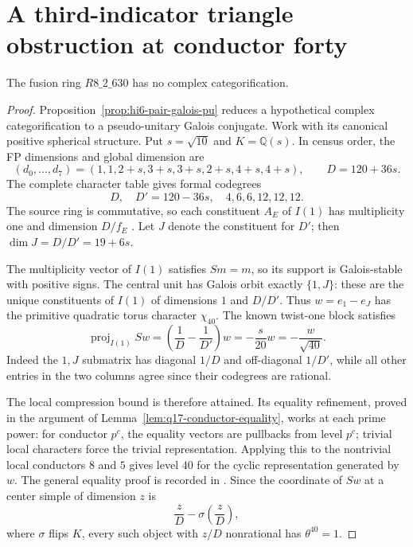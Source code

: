 \section{A third-indicator triangle obstruction at conductor forty}
\label{sec:q630-weighted-indicator}

\begin{theorem}\label{thm:q630-exclusion}
The fusion ring $R8\_2\_630$ has no complex categorification.
\end{theorem}
\begin{proof}
Proposition~\ref{prop:hi6-pair-galois-pu} reduces a hypothetical complex
categorification to a pseudo-unitary Galois conjugate. Work with its
canonical positive spherical structure. Put $s=\sqrt{10}$ and
$K=\mathbb Q(s)$. In census order, the FP dimensions and global
dimension are
\[
(d_0,\ldots,d_7)=(1,1,2+s,3+s,3+s,2+s,4+s,4+s),
\qquad D=120+36s.
\]
The complete character table gives formal codegrees
\[
D,\quad D'=120-36s,\quad 4,6,6,12,12,12.
\]
The source ring is commutative, so each constituent $A_E$ of $I(1)$
has multiplicity one and dimension $D/f_E$
\cite[Theorem~2.13]{OstrikPiv3}. Let $J$ denote the constituent for
$D'$; then $\dim J=D/D'=19+6s$.

The multiplicity vector of $I(1)$ satisfies $Sm=m$, so its support
is Galois-stable with positive signs. The central unit has Galois
orbit exactly $\{1,J\}$: these are the unique constituents of
$I(1)$ of dimensions $1$ and $D/D'$. Thus $w=e_1-e_J$ has the
primitive quadratic torus character $\chi_{40}$. The known twist-one
block satisfies
\[
\operatorname{proj}_{I(1)} Sw
 =\left(\frac1D-\frac1{D'}\right)w
 =-\frac{s}{20}w=-\frac{w}{\sqrt{40}}.
\]
Indeed the $1,J$ submatrix has diagonal $1/D$ and off-diagonal
$1/D'$, while all other entries in the two columns agree since their
codegrees are rational.

The local compression bound \cite[Lemma~4.1]{SchDimensionBlock} is
therefore attained. Its equality refinement, proved in the argument
of Lemma~\ref{lem:q17-conductor-equality}, works at each prime power:
for conductor $p^c$, the equality vectors are pullbacks from level
$p^c$; trivial local characters force the trivial representation.
Applying this to the nontrivial local conductors $8$ and $5$ gives
level $40$ for the cyclic representation generated by $w$.
The general equality proof is recorded in
.
Since the coordinate of $Sw$ at a center simple of dimension $z$ is
\[
\frac zD-\sigma\!\left(\frac zD\right),
\]
where $\sigma$ flips $K$, every such object with $z/D$ nonrational
has $\theta^{40}=1$.


\end{proof}
